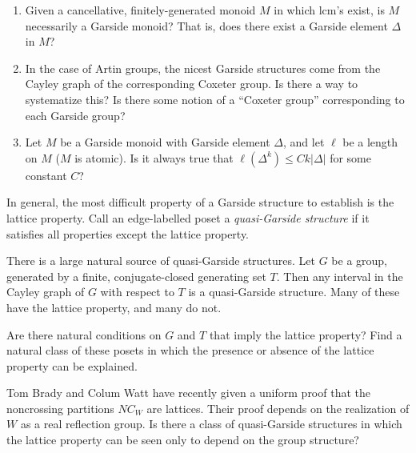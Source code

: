 \documentclass[12pt,letterpaper, reqno]{aimpl}
\begin{document}
\begin{prob}[4.2] 
\begin{enumerate}
\item Given a cancellative, finitely-generated monoid $M$ in which lcm's exist, is $M$ necessarily a Garside monoid? That is, does there exist a Garside element $\Delta$ in $M$?
\item In the case of Artin groups, the nicest Garside structures come from the Cayley graph of the corresponding Coxeter group. Is there a way to systematize this? Is there some notion of a ``Coxeter group'' corresponding to each Garside group?
\item Let $M$ be a Garside monoid with Garside element $\Delta$, and let $\ell$ be a length on $M$ ($M$ is atomic). Is it always true that $\ell(\Delta^k)\leq Ck\left|\Delta\right| $ for some constant $C$?
\end{enumerate}
\end{prob}

\begin{problemblock}
In general, the most difficult property of a Garside structure to establish is the lattice property. Call an edge-labelled poset a \emph{quasi-Garside structure} if it satisfies all properties except the lattice property.

There is a large natural source of quasi-Garside structures. Let $G$
be a group, generated by a finite, conjugate-closed generating set
$T$. Then any interval in the Cayley graph of $G$ with respect to $T$
is a quasi-Garside structure. Many of these have the lattice property,
and many do not. 

\begin{problem}[4.3]
Are there natural conditions on $G$ and $T$ that imply
the lattice property? Find a natural class of these posets in which the
presence or absence of the lattice property can be explained.
\end{problem}

\begin{remark}
Tom Brady and Colum Watt \cite{brady-watt} have recently given a uniform proof that the noncrossing partitions $NC_W$ are lattices. Their proof depends on the realization of $W$ as a real reflection group. Is there a class of quasi-Garside structures in which the lattice property can be seen only to depend on the group structure?
\end{remark}
\end{problemblock}
\end{document}
